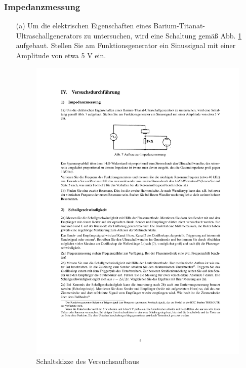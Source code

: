 \documentclass[12pt]{scrartcl}
\begin{document}
\subsubsection{Impedanzmessung}
\begin{itemize}
\item[(a)]
Um die elektrischen Eigenschaften eines Barium-Titanat-Ultraschallgenerators zu untersuchen, wird eine Schaltung gemäß Abb. \ref{fig:impedanz}
aufgebaut. Stellen Sie am Funktionsgenerator ein Sinussignal mit einer Amplitude von etwa 5 V ein.
\begin{figure}[htbp] 
  \centering
    \includegraphics[trim = 20mm 210mm 20mm 55mm, clip, scale = 1]{impedanz.pdf}
  	\caption[Schaltskizze des Versuchsaufbaus]{Schaltskizze des Versuchsaufbaus\footnotemark}
  \label{fig:impedanz}

\end{figure}
\end{itemize}
\end{document}
